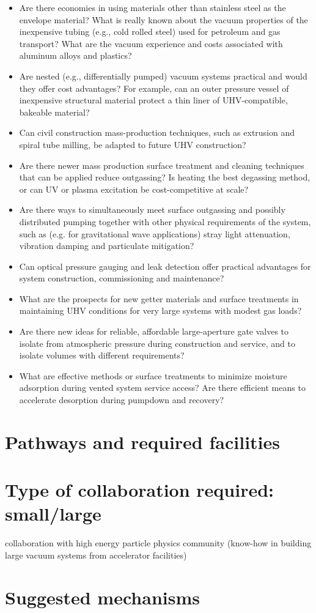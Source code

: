 \begin{itemize}
\item  Are there economies in using materials other than stainless steel as the envelope material? What is really known about the vacuum properties of the inexpensive tubing (e.g., cold rolled steel) used for petroleum and gas transport? What are the vacuum experience and costs associated with aluminum alloys and plastics?

\item Are nested (e.g., differentially pumped) vacuum systems practical and would they offer cost advantages? For example, can an outer pressure vessel of inexpensive structural material protect a thin liner of UHV-compatible, bakeable material?

\item Can civil construction mass-production techniques, such as extrusion and spiral tube milling, be adapted to future UHV construction?

\item Are there newer mass production surface treatment and cleaning techniques that can be applied reduce outgassing? Is heating the best degassing method, or can UV or plasma excitation be cost-competitive at scale?

\item Are there ways to simultaneously meet surface outgassing and possibly distributed pumping together with other physical requirements of the system, such as (e.g. for gravitational wave applications) stray light attenuation, vibration damping and particulate mitigation?

\item Can optical pressure gauging and leak detection offer practical advantages for system construction, commissioning and maintenance?

\item What are the prospects for new getter materials and surface treatments in maintaining UHV conditions for very large systems with modest gas loads?

\item Are there new ideas for reliable, affordable large-aperture gate valves to isolate from atmospheric pressure during construction and service, and to isolate volumes with different requirements?

\item What are effective methods or surface treatments to minimize moisture adsorption during vented system service access? Are there efficient means to accelerate desorption during pumpdown and recovery?

\end{itemize}



\section{Pathways and required facilities}
\section{Type of collaboration required:  small/large}
collaboration with high energy particle physics community (know-how in building large vacuum systems from accelerator facilities)
\section{Suggested mechanisms}